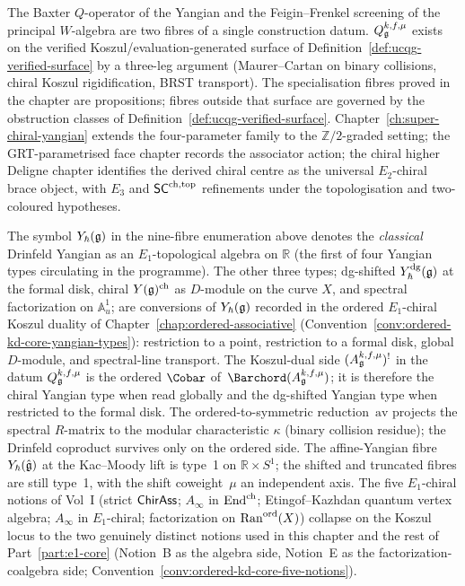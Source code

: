 The Baxter $Q$-operator of the Yangian and the Feigin--Frenkel
screening of the principal $W$-algebra are two fibres of a single
construction datum. $Q_{\mathfrak{g}}^{k,f,\mu}$ exists on the verified
Koszul/evaluation-generated surface of
Definition~\ref{def:ucqg-verified-surface} by a three-leg argument
(Maurer--Cartan on binary collisions, chiral Koszul rigidification,
BRST transport). The specialisation fibres proved in the chapter are
propositions; fibres outside that surface are governed by the
obstruction classes of Definition~\ref{def:ucqg-verified-surface}.
Chapter~\ref{ch:super-chiral-yangian} extends the four-parameter
family to the $\mathbb{Z}/2$-graded setting; the GRT-parametrised
face chapter records the associator action; the chiral higher Deligne
chapter identifies the derived chiral centre as the universal
$E_2$-chiral brace object, with $E_3$ and $\mathsf{SC}^{\mathrm{ch},\mathrm{top}}$ refinements
under the topologisation and two-coloured hypotheses.

\begin{convention}
\label{conv:ucqg-yangian-types}
The symbol $Y_{\hbar}(\mathfrak{g})$ in the nine-fibre enumeration above denotes
the \emph{classical} Drinfeld Yangian as an $E_1$-topological algebra
on $\mathbb{R}$ (the first of four Yangian types circulating in the
programme). The other three types; dg-shifted
$Y^{\mathrm{dg}}_\hbar(\mathfrak{g})$ at the formal disk, chiral
$Y(\mathfrak{g})^{\mathrm{ch}}$ as $D$-module on the curve $X$, and spectral
factorization on $\mathbb{A}^1_u$; are conversions of
$Y_{\hbar}(\mathfrak{g})$ recorded in the ordered $E_1$-chiral Koszul duality of
Chapter~\ref{chap:ordered-associative}
(Convention~\ref{conv:ordered-kd-core-yangian-types}): restriction to
a point, restriction to a formal disk, global $D$-module, and
spectral-line transport. The Koszul-dual side
$(A^{k,f,\mu}_{\mathfrak{g}})^!$
in the datum $Q^{k,f,\mu}_{\mathfrak{g}}$ is the ordered $\Cobar$
of~$\Barchord(A^{k,f,\mu}_\fg)$; it is therefore the chiral Yangian
type when read globally and the dg-shifted Yangian type when
restricted to the formal disk. The ordered-to-symmetric
reduction~$\mathrm{av}$ projects the spectral $R$-matrix to the
modular characteristic $\kappa$ (binary collision residue); the
Drinfeld coproduct survives only on the ordered side. The
affine-Yangian fibre $Y_{\hbar}(\hat{\mathfrak{g}})$ at the Kac--Moody lift is
type~1 on $\mathbb{R}\times S^1$; the shifted and truncated fibres
are still type~1, with the shift coweight~$\mu$ an independent axis.
The five $E_1$-chiral notions of
Vol~I (strict $\mathsf{ChirAss}$; $A_\infty$ in $\mathrm{End}^{\mathrm{ch}}$;
Etingof--Kazhdan quantum vertex algebra; $A_\infty$ in $E_1$-chiral;
factorization on $\mathrm{Ran}^{\mathrm{ord}}(X)$) collapse on the Koszul
locus to the two genuinely distinct notions used in this chapter and
the rest of Part~\ref{part:e1-core} (Notion~B as the algebra side,
Notion~E as the factorization-coalgebra side;
Convention~\ref{conv:ordered-kd-core-five-notions}).
\end{convention}

